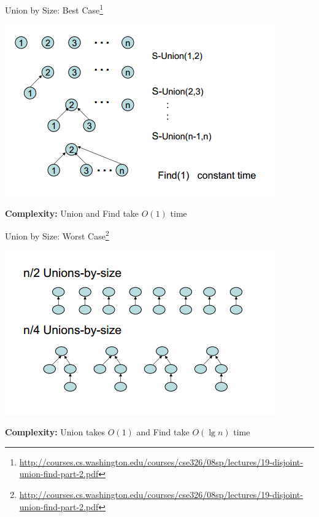 \documentclass{beamer}
\begin{document}
\begin{frame}{Union by Size: Best Case\footnote{\url{http://courses.cs.washington.edu/courses/cse326/08sp/lectures/19-disjoint-union-find-part-2.pdf}}}

    \begin{center}
        \includegraphics[scale=0.5]{unionByRankBestCase.png} 
    \end{center}

    {\bf Complexity:} \pause Union and Find take $O(1)$ time
\end{frame}

\begin{frame}{Union by Size: Worst Case\footnote{\url{http://courses.cs.washington.edu/courses/cse326/08sp/lectures/19-disjoint-union-find-part-2.pdf}}}
    \begin{center}
        \includegraphics[scale=0.5]{unionByRankWorstCase.png} 
    \end{center}
    {\bf Complexity:} \pause Union takes $O(1)$ and Find take $O(\lg n)$ time
\end{frame}
\end{document}
